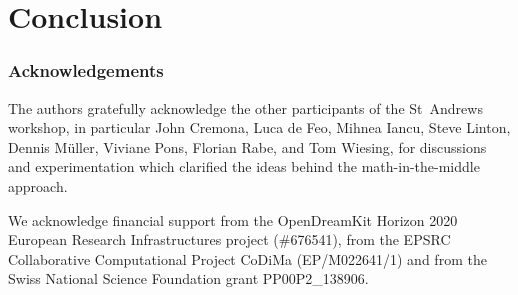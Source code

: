 \section{Conclusion}
\label{sec:concl}
\subsubsection*{Acknowledgements}

The authors gratefully acknowledge the other participants of the
St~Andrews workshop, in particular John Cremona, Luca de Feo, Mihnea
Iancu, Steve Linton, Dennis M\"uller, Viviane
Pons, Florian Rabe, and Tom Wiesing, for discussions and
experimentation which clarified the ideas behind the
math-in-the-middle approach.

We acknowledge financial support from the OpenDreamKit Horizon 2020 European Research
Infrastructures project (\#676541), from the EPSRC Collaborative Computational Project
CoDiMa (EP/M022641/1) and from the Swiss National Science Foundation grant PP00P2\_138906.



